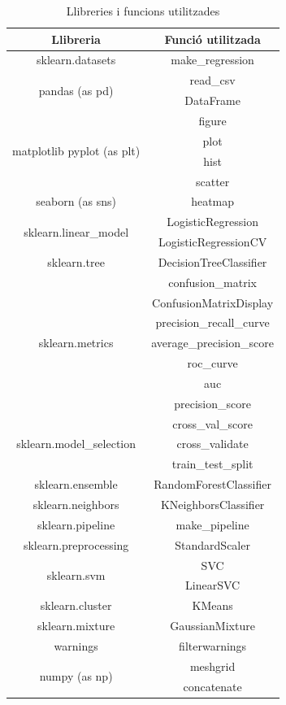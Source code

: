 \documentclass[a4paper, 11pt]{article}
\begin{document}
\begin{table}[h]
    \centering
    \begin{tabular}{c|c}
        \textbf{Llibreria} & \textbf{Funció utilitzada} \\\hline\hline
        sklearn.datasets & make\_regression \\ \hline
         \multirow{2}{*}{pandas (as pd)} & read\_csv \\ 
        & DataFrame \\ \hline
        \multirow{4}{*}{matplotlib pyplot (as plt)} & figure\\
        & plot \\ 
        & hist \\
        & scatter\\ \hline
        seaborn (as sns) & heatmap \\\hline
        \multirow{2}{*}{sklearn.linear\_model} & LogisticRegression \\
         & LogisticRegressionCV \\\hline
        sklearn.tree & DecisionTreeClassifier\\ \hline
        \multirow{7}{*}{sklearn.metrics} & confusion\_matrix \\ 
        & ConfusionMatrixDisplay \\
        & precision\_recall\_curve\\
        & average\_precision\_score\\
        & roc\_curve\\
        & auc \\
        & precision\_score \\\hline
        \multirow{3}{*}{sklearn.model\_selection} & cross\_val\_score \\ 
        & cross\_validate \\
        & train\_test\_split \\\hline
        sklearn.ensemble & RandomForestClassifier \\\hline
        sklearn.neighbors & KNeighborsClassifier \\ \hline
        sklearn.pipeline & make\_pipeline\\ \hline
        sklearn.preprocessing & StandardScaler\\ \hline
        \multirow{2}{*}{sklearn.svm} & SVC\\ 
        & LinearSVC \\\hline
        sklearn.cluster & KMeans \\\hline
        sklearn.mixture & GaussianMixture \\ \hline
        warnings & filterwarnings \\ \hline
        \multirow{2}{*}{numpy (as np)} & meshgrid \\
        & concatenate \\
    \end{tabular}
    \label{imports}
    \caption{Llibreries i funcions utilitzades}
\end{table}
\end{document}
